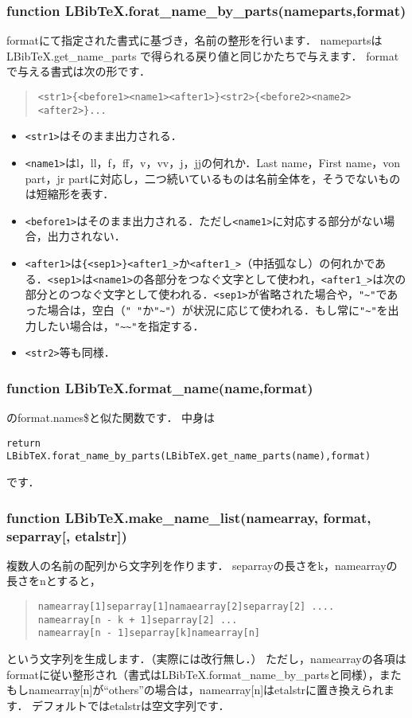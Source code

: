 \documentclass[a4paper]{ltjsarticle}
\begin{document}
\subsubsection{function LBibTeX.forat\_name\_by\_parts(nameparts,format)}
formatにて指定された書式に基づき，名前の整形を行います．
namepartsはLBibTeX.get\_name\_parts で得られる戻り値と同じかたちで与えます．
formatで与える書式は次の形です．
\begin{quote}
\begin{verbatim}
<str1>{<before1><name1><after1>}<str2>{<before2><name2><after2>}...
\end{verbatim}
\end{quote}
\begin{itemize}
\item \verb|<str1>|はそのまま出力される．
\item \verb|<name1>|はl，ll，f，ff，v，vv，j，jjの何れか．Last name，First name，von part，jr partに対応し，二つ続いているものは名前全体を，そうでないものは短縮形を表す．
\item \verb|<before1>|はそのまま出力される．ただし\verb|<name1>|に対応する部分がない場合，出力されない．
\item \verb|<after1>|は\verb|{<sep1>}<after1_>|か\verb|<after1_>|（中括弧なし）の何れかである．\verb|<sep1>|は\verb|<name1>|の各部分をつなぐ文字として使われ，\verb|<after1_>|は次の部分とのつなぐ文字として使われる．\verb|<sep1>|が省略された場合や，\verb|"~"|であった場合は，空白（\verb|" "|か\verb|"~"|）が状況に応じて使われる．もし常に\verb|"~"|を出力したい場合は，\verb|"~~"|を指定する．
\item \verb|<str2>|等も同様．
\end{itemize}

\subsubsection{function LBibTeX.format\_name(name,format)}
\BibTeX のformat.names\$と似た関数です．
中身は
\begin{lstlisting}
return LBibTeX.forat_name_by_parts(LBibTeX.get_name_parts(name),format)
\end{lstlisting}
です．

\subsubsection{function LBibTeX.make\_name\_list(namearray, format, separray[, etalstr])}
複数人の名前の配列から文字列を作ります．
separrayの長さをk，namearrayの長さをnとすると，
\begin{quote}
\begin{verbatim}
namearray[1]separray[1]namaearray[2]separray[2] .... 
namearray[n - k + 1]separray[2] ...
namearray[n - 1]separray[k]namearray[n]
\end{verbatim}
\end{quote}
という文字列を生成します．（実際には改行無し．）
ただし，namearrayの各項はformatに従い整形され（書式はLBibTeX.format\_name\_by\_partsと同様），またもしnamearray[n]が``others''の場合は，namearray[n]はetalstrに置き換えられます．
デフォルトではetalstrは空文字列です．
\end{document}
